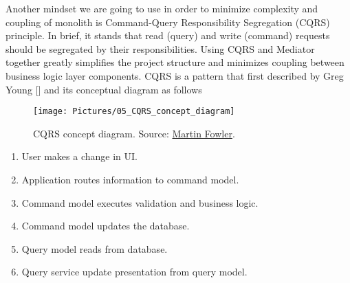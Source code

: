 Another mindset we are going to use in order to minimize complexity and coupling of monolith is Command-Query
Responsibility Segregation (CQRS) principle.
In brief, it stands that read (query) and write (command) requests should be segregated by their responsibilities.
Using CQRS and Mediator together greatly simplifies the project structure and minimizes coupling between business
logic layer components.
CQRS is a pattern that first described by Greg Young [\cite{young2010cqrs}] and its conceptual diagram as follows

\begin{figure}[H]
    \centering
    \texttt{[image: Pictures/05\_CQRS\_concept\_diagram]}
    \caption{CQRS concept diagram.
    Source: \href{https://martinfowler.com/bliki/CQRS.html}{Martin Fowler}.}
    \label{fig:figure}
\end{figure}

\begin{enumerate}
    \item User makes a change in UI\@.
    \item Application routes information to command model.
    \item Command model executes validation and business logic.
    \item Command model updates the database.
    \item Query model reads from database.
    \item Query service update presentation from query model.
\end{enumerate}